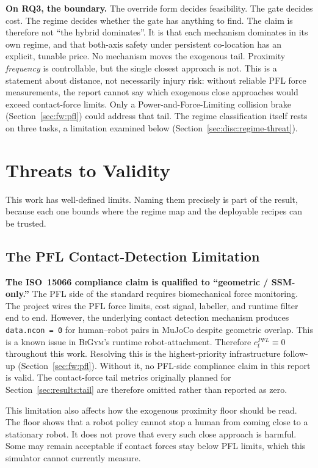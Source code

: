 \documentclass[11pt,a4paper]{report}
\newcommand{\ssm}{SSM}
\newcommand{\pfl}{PFL}
\newcommand{\iso}{ISO~15066}
\newcommand{\bigym}{\textsc{BiGym}}
\begin{document}
\textbf{On RQ3, the boundary.} The override form decides feasibility.
The gate decides cost. The regime decides whether the gate has
anything to find. The claim is therefore not ``the hybrid dominates''.
It is that each mechanism dominates in its own regime, and that
both-axis safety under persistent co-location has an explicit,
tunable price. No mechanism moves the exogenous tail. Proximity
\emph{frequency} is controllable, but the single closest approach is
not. This is a statement about distance, not necessarily injury risk:
without reliable \pfl{} force measurements, the report cannot say which
exogenous close approaches would exceed contact-force limits. Only a
Power-and-Force-Limiting collision brake (Section~\ref{sec:fw:pfl})
could address that tail. The regime
classification itself rests on three tasks, a limitation examined
below (Section~\ref{sec:disc:regime-threat}).

\section{Threats to Validity}
\label{sec:disc:threats}

This work has well-defined limits. Naming them precisely is part of
the result, because each one bounds where the regime map and the
deployable recipes can be trusted.

\subsection{The \pfl{} Contact-Detection Limitation}
\label{sec:disc:pfl-bug}

\textbf{The \iso{} compliance claim is qualified to ``geometric /
\ssm{}-only.''} The \pfl{} side of the standard requires
biomechanical force monitoring. The project wires the \pfl{} force
limits, cost signal, labeller, and runtime filter end to end. However,
the underlying contact detection mechanism produces
\texttt{data.ncon = 0} for human--robot pairs in MuJoCo despite
geometric overlap. This is a known issue in \bigym{}'s runtime
robot-attachment. Therefore $c^{\pfl}_t \equiv 0$ throughout this
work. Resolving this is the highest-priority infrastructure follow-up
(Section~\ref{sec:fw:pfl}). Without it,
no \pfl{}-side compliance claim in this report is valid. The
contact-force tail metrics originally planned for
Section~\ref{sec:results:tail} are therefore omitted rather than
reported as zero.

This limitation also affects how the exogenous proximity floor should
be read. The floor shows that a robot policy cannot stop a human from
coming close to a stationary robot. It does not prove that every such
close approach is harmful. Some may remain acceptable if contact forces
stay below \pfl{} limits, which this simulator cannot currently
measure.
\end{document}
